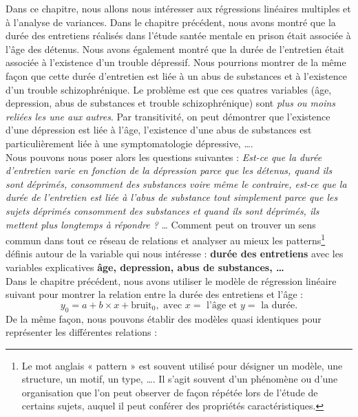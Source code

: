 Dans ce chapitre, nous allons nous intéresser aux régressions linéaires multiples et à l'analyse de variances.\newline
Dans le chapitre précédent, nous avons montré que la durée des entretiens réalisés dans l'étude santée mentale en prison était associée à l'âge des détenus. Nous avons également montré que la durée de l'entretien était associée à l'existence d'un trouble dépressif. Nous pourrions montrer de la même façon que cette durée d'entretien est liée à un abus de substances et à l'existence d'un trouble schizophrénique.\newline
Le problème est que ces quatres variables (âge, depression, abus de substances et trouble schizophrénique) sont \textit{plus ou moins reliées les une aux autres}.\newline
Par transitivité, on peut démontrer que l'existence d'une dépression est liée à l'âge, l'existence d'une abus de substances est particulièrement liée à une symptomatologie dépressive, \dots.\newline
\\
Nous pouvons nous poser alors les questions suivantes : \textit{Est-ce que la durée d'entretien varie en fonction de la dépression parce que les détenus, quand ils sont déprimés, consomment des substances voire même le contraire, est-ce que la durée de l'entretien est liée à l'abus de substance tout simplement parce que les sujets déprimés consomment des substances et quand ils sont déprimés, ils mettent plus longtemps à répondre ?} \dots 
Comment peut on trouver un sens commun dans tout ce réseau de relations et analyser au mieux les patterns\footnote{Le mot anglais « pattern » est souvent utilisé pour désigner un modèle, une structure, un motif, un type, \dots. Il s'agit souvent d'un phénomène ou d'une organisation que l'on peut observer de façon répétée lors de l'étude de certains sujets, auquel il peut conférer des propriétés caractéristiques. } définis autour de la variable qui nous intéresse : \textbf{durée des entretiens} avec les variables explicatives \textbf{âge, depression, abus de substances, \dots}\newline
\\
Dans le chapitre précédent, nous avons utiliser le modèle de régression linéaire suivant pour montrer la relation entre la durée des entretiens et l'âge :
$$ y_{0} = a + b\times x + \textrm{bruit}_{0}, \textrm{ avec } x = \textrm{ l'âge et } y = \textrm{ la durée.}$$
De la même façon, nous pouvons établir des modèles quasi identiques pour représenter les différentes relations :
